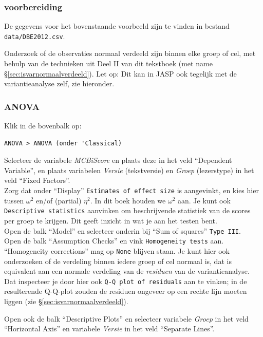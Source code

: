 \documentclass[
]{book}
\begin{document}
\subsubsection{voorbereiding}\label{voorbereiding-4}

De gegevens voor het bovenstaande voorbeeld zijn te vinden in bestand \texttt{data/DBE2012.csv}.

Onderzoek of de observaties normaal verdeeld zijn binnen elke groep of cel, met behulp van de technieken uit Deel II van dit tekstboek (met name
§\ref{sec:isvarnormaalverdeeld}). Let op: Dit kan in JASP ook tegelijk met de variantieanalyse zelf, zie hieronder.

\subsubsection{ANOVA}\label{anova-4}

Klik in de bovenbalk op:

\begin{verbatim}
ANOVA > ANOVA (onder 'Classical)
\end{verbatim}

Selecteer de variabele \emph{MCBiScore} en plaats deze in het veld ``Dependent Variable'', en plaats variabelen \emph{Versie} (tekstversie) en \emph{Groep} (lezerstype) in het veld ``Fixed Factors''.\\
Zorg dat onder ``Display'' \texttt{Estimates\ of\ effect\ size} is aangevinkt, en kies hier tussen \(\omega^2\) en/of (partial) \(\eta^2\). In dit boek houden we \(\omega^2\) aan. Je kunt ook \texttt{Descriptive\ statistics} aanvinken om beschrijvende statistiek van de scores per groep te krijgen. Dit geeft inzicht in wat je aan het testen bent.\\
Open de balk ``Model'' en selecteer onderin bij ``Sum of squares'' \texttt{Type\ III}.\\
Open de balk ``Assumption Checks'' en vink \texttt{Homogeneity\ tests} aan. ``Homogeneity corrections'' mag op \texttt{None} blijven staan. Je kunt hier ook onderzoeken of de verdeling binnen iedere groep of cel normaal is, dat is equivalent aan een normale verdeling van de \emph{residuen} van de variantieanalyse. Dat inspecteer je door hier ook \texttt{Q-Q\ plot\ of\ residuals} aan te vinken; in de resulterende Q-Q-plot zouden de residuen ongeveer op een rechte lijn moeten liggen (zie §\ref{sec:isvarnormaalverdeeld}).

Open ook de balk ``Descriptive Plots'' en selecteer variabele \emph{Groep} in het veld ``Horizontal Axis'' en variabele \emph{Versie} in het veld ``Separate Lines''.
\end{document}
